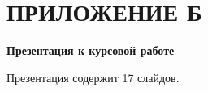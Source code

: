 \section*{ПРИЛОЖЕНИЕ Б}

\begin{center}
\textbf{Презентация к курсовой работе}
\end{center}
Презентация содержит 17 слайдов.

\pagebreak